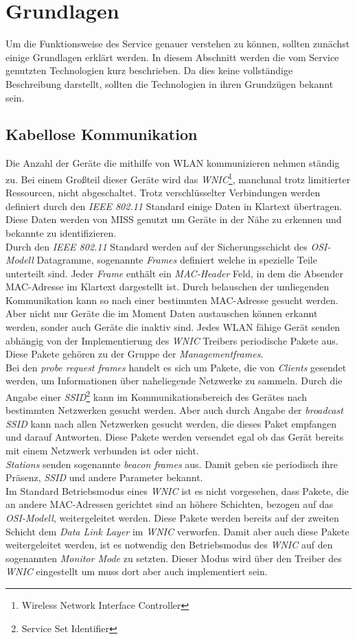 \documentclass[]{report}
\begin{document}
\chapter{Grundlagen}
Um die Funktionsweise des Service genauer verstehen zu können, sollten zunächst einige Grundlagen erklärt werden. In diesem Abschnitt werden die vom Service genutzten Technologien kurz beschrieben. Da dies keine vollständige Beschreibung darstellt, sollten die Technologien in ihren Grundzügen bekannt sein. 
\section{Kabellose Kommunikation}
Die Anzahl der Geräte die mithilfe von WLAN kommunizieren nehmen ständig zu. Bei einem Großteil dieser Geräte wird das \textit{WNIC}\footnote{Wireless Network Interface Controller}, manchmal trotz limitierter Ressourcen, nicht abgeschaltet. Trotz verschlüsselter Verbindungen werden definiert durch den \textit{IEEE 802.11}\cite{IEEE} Standard einige Daten in Klartext übertragen. Diese Daten werden von MISS genutzt um Geräte in der Nähe zu erkennen und bekannte zu identifizieren. \\
Durch den \textit{IEEE 802.11} Standard werden auf der Sicherungsschicht des \textit{OSI-Modell}\cite{OSI}  Datagramme, sogenannte \textit{Frames} definiert welche in spezielle Teile unterteilt sind. Jeder \textit{Frame} enthält ein \textit{MAC-Header} Feld, in dem die Absender MAC-Adresse im Klartext dargestellt ist. Durch belauschen der umliegenden Kommunikation kann so nach einer bestimmten MAC-Adresse gesucht werden. \\
Aber nicht nur Geräte die im Moment Daten austauschen können erkannt werden, sonder auch Geräte die inaktiv sind. Jedes WLAN fähige Gerät senden abhängig von der Implementierung des \textit{WNIC} Treibers periodische Pakete aus. Diese Pakete gehören zu der Gruppe der \textit{Managementframes}. \\
Bei den \textit{probe request frames} handelt es sich um Pakete, die von \textit{Clients} gesendet werden, um Informationen über naheliegende Netzwerke zu sammeln. Durch die Angabe einer \textit{SSID}\footnote{Service Set Identifier} kann im Kommunikationsbereich des Gerätes nach bestimmten Netzwerken gesucht werden. Aber auch durch Angabe der \textit{broadcast SSID} kann nach allen Netzwerken gesucht werden, die dieses Paket empfangen und darauf Antworten. Diese Pakete werden versendet egal ob das Gerät bereits mit einem Netzwerk verbunden ist oder nicht.\\
\textit{Stations} senden sogenannte \textit{beacon frames} aus. Damit geben sie periodisch ihre Präsenz, \textit{SSID} und andere Parameter bekannt. \\
Im Standard Betriebsmodus eines \textit{WNIC} ist es nicht vorgesehen, dass Pakete, die an andere MAC-Adressen gerichtet sind an höhere Schichten, bezogen auf das \textit{OSI-Modell}, weitergeleitet werden. Diese Pakete werden bereits auf der zweiten Schicht dem \textit{Data Link Layer} im \textit{WNIC} verworfen. Damit aber auch diese Pakete weitergeleitet werden, ist es notwendig den Betriebsmodus des \textit{WNIC} auf den sogenannten \textit{Monitor Mode} zu setzten. Dieser Modus wird über den Treiber des \textit{WNIC} eingestellt um muss dort aber auch implementiert sein. 
\end{document}
